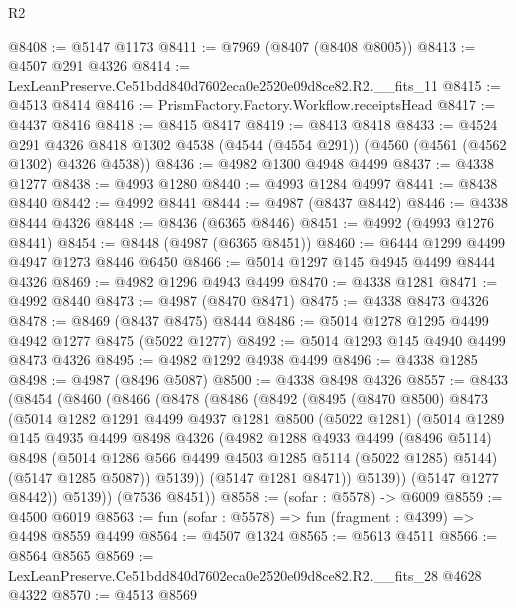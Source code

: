 \begin{lexlean}{R2}
\begin{coremodule}
@8408 := @5147 @1173
@8411 := @7969 (@8407 (@8408 @8005))
@8413 := @4507 @291 @4326
@8414 := LexLeanPreserve.Ce51bdd840d7602eca0e2520e09d8ce82.R2.__fits_11
@8415 := @4513 @8414
@8416 := PrismFactory.Factory.Workflow.receiptsHead
@8417 := @4437 @8416
@8418 := @8415 @8417
@8419 := @8413 @8418
@8433 := @4524
    @291
    @4326
    @8418
    @1302
    @4538
    (@4544 (@4554 @291))
    (@4560 (@4561 (@4562 @1302) @4326 @4538))
@8436 := @4982 @1300 @4948 @4499
@8437 := @4338 @1277
@8438 := @4993 @1280
@8440 := @4993 @1284 @4997
@8441 := @8438 @8440
@8442 := @4992 @8441
@8444 := @4987 (@8437 @8442)
@8446 := @4338 @8444 @4326
@8448 := @8436 (@6365 @8446)
@8451 := @4992 (@4993 @1276 @8441)
@8454 := @8448 (@4987 (@6365 @8451))
@8460 := @6444 @1299 @4499 @4947 @1273 @8446 @6450
@8466 := @5014 @1297 @145 @4945 @4499 @8444 @4326
@8469 := @4982 @1296 @4943 @4499
@8470 := @4338 @1281
@8471 := @4992 @8440
@8473 := @4987 (@8470 @8471)
@8475 := @4338 @8473 @4326
@8478 := @8469 (@8437 @8475) @8444
@8486 := @5014 @1278 @1295 @4499 @4942 @1277 @8475 (@5022 @1277)
@8492 := @5014 @1293 @145 @4940 @4499 @8473 @4326
@8495 := @4982 @1292 @4938 @4499
@8496 := @4338 @1285
@8498 := @4987 (@8496 @5087)
@8500 := @4338 @8498 @4326
@8557 := @8433
    (@8454
      (@8460
        (@8466
          (@8478
            (@8486
              (@8492
                (@8495
                  (@8470 @8500)
                  @8473
                  (@5014
                    @1282
                    @1291
                    @4499
                    @4937
                    @1281
                    @8500
                    (@5022 @1281)
                    (@5014
                      @1289
                      @145
                      @4935
                      @4499
                      @8498
                      @4326
                      (@4982
                        @1288
                        @4933
                        @4499
                        (@8496 @5114)
                        @8498
                        (@5014 @1286 @566 @4499 @4503 @1285 @5114 (@5022 @1285) @5144)
                        (@5147 @1285 @5087))
                      @5139))
                  (@5147 @1281 @8471))
                @5139))
            (@5147 @1277 @8442))
          @5139))
      (@7536 @8451))
@8558 := (sofar : @5578) -> @6009
@8559 := @4500 @6019
@8563 := fun (sofar : @5578) => fun (fragment : @4399) => @4498 @8559 @4499
@8564 := @4507 @1324
@8565 := @5613 @4511
@8566 := @8564 @8565
@8569 := LexLeanPreserve.Ce51bdd840d7602eca0e2520e09d8ce82.R2.__fits_28 @4628 @4322
@8570 := @4513 @8569

\end{coremodule}
\end{lexlean}
